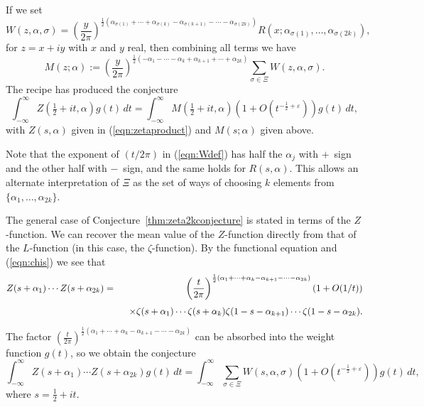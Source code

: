 \documentclass[12pt,letterpaper]{amsart}
\theoremstyle{plain}
\theoremstyle{definition}
\theoremstyle{remark}
\numberwithin{equation}{subsection}
\numberwithin{theorem}{subsection}
\numberwithin{table}{subsection}
\begin{document}
If we set
\begin{equation}\label{eqn:Wdef}
W(z,\alpha ,\sigma)=\left( \frac{y}{2\pi}\right)^{\frac{1}{2}
(\alpha _{\sigma(1)}+ \cdots + \alpha _{\sigma(k)} -\alpha
      _{\sigma(k+1)}-\cdots -\alpha _{\sigma(2k)})} 
R(x; \alpha _{\sigma(1)},\ldots,\alpha _{\sigma(2k)}),
 \end{equation}
for $z=x+iy$ with $x$ and $y$ real,
then combining all terms we have 
\begin{equation}
M(z;\alpha):=
\left( \frac{y}{2\pi}
\right)^{\frac{1}{2}(-\alpha _1-\cdots
 -\alpha _k+\alpha _{k+1}+\cdots +\alpha _{2k})} \sum_{\sigma \in \Xi}
 W(z,\alpha ,\sigma). 
\end{equation}
The recipe has produced the conjecture
\begin{equation}\label{conj:M}  %
\int_{-\infty}^\infty Z(\tfrac12+it,\alpha)g(t)\,dt =
\int_{-\infty}^\infty M(\tfrac12+it,\alpha)(1+O(t^{-\frac12 + \varepsilon}))g(t)\,dt ,
\end{equation}
with $Z(s,\alpha)$ given in (\ref{eqn:zetaproduct}) and $M(s;\alpha)$ given above.

Note that the exponent of $(t/2\pi)$ in (\ref{eqn:Wdef}) has half the
$\alpha_j$ with $+$~sign and the other half with $-$~sign, and the same
holds for $R(s,\alpha)$.  This allows an alternate 
interpretation of
$\Xi$ as the set of ways  of choosing $k$ elements 
from $\{\alpha_1,\dots,\alpha_{2k}\}$.

The general case of Conjecture~\ref{thm:zeta2kconjecture} is stated in terms of
the $Z$-function.   We can recover the mean value of the $Z$-function
directly from that of the $L$-function (in this case, the $\zeta$-function). 
By the functional equation and (\ref{eqn:chis}) we see that
\begin{eqnarray}
Z(s+\alpha_1)\cdots
Z(s+\alpha_{2k})
& =& \left( \frac{t}{2\pi}
\right)^{\frac{1}{2}(\alpha _1+\cdots
 +\alpha _k-\alpha _{k+1}-\cdots -\alpha _{2k})} (1+O(1/t)) \cr
&& \ \ \Bigl. \times \zeta(s+\alpha _1)\cdots \zeta(s+\alpha
_k)\zeta(1-s-\alpha _{k+1})\cdots \zeta(1-s-\alpha _{2k}).
\end{eqnarray}
The factor $\displaystyle  
\left( \frac{t}{2\pi}
\right)^{\frac{1}{2}(\alpha _1+\cdots
 +\alpha _k-\alpha _{k+1}-\cdots -\alpha _{2k})}
$
can be absorbed into the weight function $g(t)$, so we obtain the conjecture
\begin{equation}\label{eqn:firstZmeanvalue}
\int_{-\infty}^\infty Z(s+\alpha_1)\cdots
Z(s+\alpha_{2k})
g(t)\, dt =
\int_{-\infty}^\infty
\sum_{\sigma \in \Xi}
 W(s,\alpha ,\sigma)(1+O(t^{-\frac12 + \varepsilon}))g(t)\,dt ,
\end{equation}
where $s=\frac12+it$.
\end{document}
